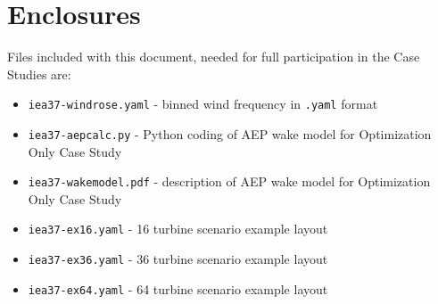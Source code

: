 \documentclass{article}
\begin{document}
\section{Enclosures}
    Files included with this document, needed for full participation in the Case Studies are:

    \begin{itemize}[noitemsep,topsep=0pt,parsep=0pt,partopsep=0pt]
        \item \texttt{iea37-windrose.yaml} - binned wind frequency in \texttt{.yaml} format
        \item \texttt{iea37-aepcalc.py} - Python coding of AEP wake model for Optimization Only Case Study
        \item \texttt{iea37-wakemodel.pdf} - description of AEP wake model for Optimization Only Case Study
        \item \texttt{iea37-ex16.yaml} - 16 turbine scenario example layout
        \item \texttt{iea37-ex36.yaml} - 36 turbine scenario example layout
        \item \texttt{iea37-ex64.yaml} - 64 turbine scenario example layout
    \end{itemize}
\vspace{-1em}


\end{document}
